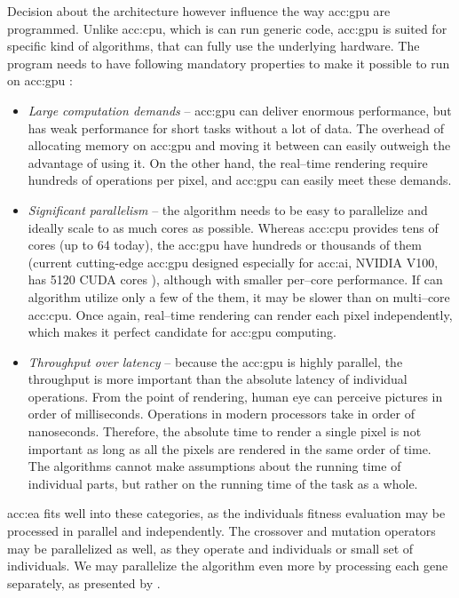 Decision about the architecture however influence the way \acrshort{acc:gpu} are programmed. Unlike \acrshort{acc:cpu}, which is can run generic code, \acrshort{acc:gpu} is suited for specific kind of algorithms, that can fully use the underlying hardware. The program needs to have following mandatory properties to make it possible to run on \acrshort{acc:gpu} \citep{GPUComputingOwens}:
\begin{itemize}
    \item \textit{Large computation demands} -- \acrshort{acc:gpu} can deliver enormous performance, but has weak performance for short tasks without a lot of data. The overhead of allocating memory on \acrshort{acc:gpu} and moving it between can easily outweigh the advantage of using it. On the other hand, the real--time rendering require hundreds of operations per pixel, and \acrshort{acc:gpu} can easily meet these demands.
    \item \textit{Significant parallelism} -- the algorithm needs to be easy to parallelize and ideally scale to as much cores as possible. Whereas \acrshort{acc:cpu} provides tens of cores (up to 64 today), the \acrshort{acc:gpu} have hundreds or thousands of them (current cutting-edge \acrshort{acc:gpu} designed especially for \acrshort{acc:ai}, NVIDIA V100, has 5120 CUDA cores \citep{nvidiav100spec}), although with smaller per--core performance. If can algorithm utilize only a few of the them, it may be slower than on multi--core \acrshort{acc:cpu}. Once again, real--time rendering can render each pixel independently, which makes it perfect candidate for \acrshort{acc:gpu} computing.
    \item \textit{Throughput over latency} -- because the \acrshort{acc:gpu} is highly parallel, the throughput is more important than the absolute latency of individual operations. From the point of rendering, human eye can perceive pictures in order of milliseconds. Operations in modern processors take in order of nanoseconds. Therefore, the absolute time to render a single pixel is not important as long as all the pixels are rendered in the same order of time. The algorithms cannot make assumptions about the running time of individual parts, but rather on the running time of the task as a whole.
\end{itemize}

\acrlong{acc:ea} fits well into these categories, as the individuals fitness evaluation may be processed in parallel and independently. The crossover and mutation operators may be parallelized as well, as they operate and individuals or small set of individuals. We may parallelize the algorithm even more by processing each gene separately, as presented by \citet{CHENG2019514}.


